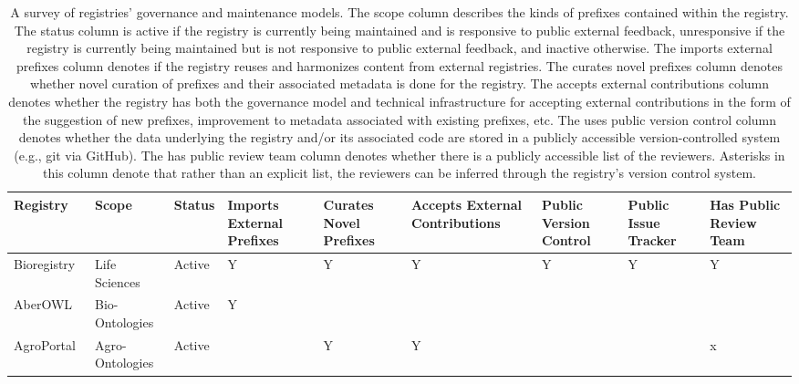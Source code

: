 \begin{table}
\centering
\caption{A survey of registries' governance and maintenance models. The scope column describes the kinds of prefixes contained within the registry. The status column is active if the registry is currently being maintained and is responsive to public external feedback, unresponsive if the registry is currently being maintained but is not responsive to public external feedback, and inactive otherwise. The imports external prefixes column denotes if the registry reuses and harmonizes content from external registries. The curates novel prefixes column denotes whether novel curation of prefixes and their associated metadata is done for the registry. The accepts external contributions column denotes whether the registry has both the governance model and technical infrastructure for accepting external contributions in the form of the suggestion of new prefixes, improvement to metadata associated with existing prefixes, etc. The uses public version control column denotes whether the data underlying the registry and/or its associated code are stored in a publicly accessible version-controlled system (e.g., git via GitHub). The has public review team column denotes whether there is a publicly accessible list of the reviewers. Asterisks in this column denote that rather than an explicit list, the reviewers can be inferred through the registry's version control system.}
\label{tab:registry-comparison-governance}
\begin{tabular}{lllllllll}
\toprule
                               Registry &           Scope &       Status & Imports External Prefixes & Curates Novel Prefixes & Accepts External Contributions & Public Version Control & Public Issue Tracker & Has Public Review Team \\
\midrule
            Bioregistry~\cite{Hoyt2022} &   Life Sciences &       Active &                         Y &                      Y &                              Y &                      Y &                    Y &                      Y \\
           AberOWL~\cite{Hoehndorf2015} &  Bio-Ontologies &       Active &                         Y &                        &                                &                        &                      &                        \\
          AgroPortal~\cite{Jonquet2018} & Agro-Ontologies &       Active &                           &                      Y &                              Y &                        &                      &                      x \\

\end{tabular}
\end{table}
